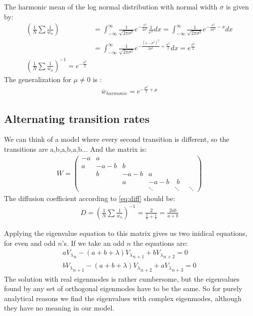 \documentclass[onecolumn,fleqn]{revtex4}
\begin{document}
The harmonic mean of the log normal distribution with normal width $\sigma$ is given by:
\begin{align}
\left(\frac{1}{N}\sum\frac{1}{w_n}\right)&= \int_{-\infty}^\infty \frac{1}{\sqrt{2\pi\sigma^2}}e^{-\frac{x^2}{2\sigma^2}} \frac{1}{e^x} dx  = \int_{-\infty}^\infty \frac{1}{\sqrt{2\pi\sigma^2}}e^{-\frac{x^2}{2\sigma^2}-x} dx \\
&= \int_{-\infty}^\infty \frac{1}{\sqrt{2\pi\sigma^2}}e^{-\frac{\left(x-\sigma^2\right)^2}{2\sigma^2}+\frac{\sigma^2}{2}} dx = e^{\frac{\sigma^2}{2}}\\
\left(\frac{1}{N}\sum\frac{1}{w_n}\right)^{-1} = e^{-\frac{\sigma^2}{2}}
\end{align}
The generalization for $\mu\neq 0$ is :
\begin{align}
\overline{w}_{harmonic} = e^{-\frac{\sigma^2}{2}+\mu}
\end{align}
\subsection{Alternating transition rates}
We can think of a model where every second transition is different, so the transitions are a,b,a,b,a,b... And the matrix is:
\begin{align}
W = 
\begin{pmatrix}
-a  & a \\
a  & -a-b &  b \\
 & b & -a-b &  a \\
& & a & -a-b & \; b \\
& & & \ddots &\ddots&\;\;\ddots
\end{pmatrix}
\end{align}
The diffusion coefficient according to \ref{eq:diff} should be:
\begin{align}
D = \left(\frac{1}{N}\sum\frac{1}{w_n}\right)^{-1} = \frac{2}{\frac{1}{a} + \frac{1}{b}} = \frac{2ab}{a+b}
\end{align}

Applying the eigenvalue equation to this matrix gives us two inidical equations, for even and odd $n$'s. If we take an odd $n$ the equations are:
\begin{align}
a {V_\lambda}_n - (a+b+\lambda){V_\lambda}_{n+1} + b {V_\lambda}_{n+2} =0  \\
b {V_\lambda}_{n+1} - (a+b+\lambda){V_\lambda}_{n+2} + a {V_\lambda}_{n+3} =0 
\end{align}
The solution with real eigenmodes is rather cumbersome, but the eigenvalues found by any set of orthogonal eigenmodes have to be the same. So for purely analytical reasons we find the eigenvalues with complex eigenmodes, although they have no meaning in our model.
\end{document}
